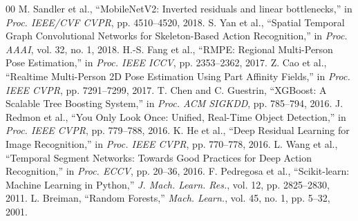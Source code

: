 \documentclass{ieeeaccess}
\begin{document}
\begin{thebibliography}{00}
 M. Sandler et al., ``MobileNetV2: Inverted residuals and linear bottlenecks,'' in \textit{Proc. IEEE/CVF CVPR}, pp. 4510--4520, 2018.
 S. Yan et al., ``Spatial Temporal Graph Convolutional Networks for Skeleton-Based Action Recognition,'' in \textit{Proc. AAAI}, vol. 32, no. 1, 2018.
 H.-S. Fang et al., ``RMPE: Regional Multi-Person Pose Estimation,'' in \textit{Proc. IEEE ICCV}, pp. 2353--2362, 2017.
 Z. Cao et al., ``Realtime Multi-Person 2D Pose Estimation Using Part Affinity Fields,'' in \textit{Proc. IEEE CVPR}, pp. 7291--7299, 2017.
 T. Chen and C. Guestrin, ``XGBoost: A Scalable Tree Boosting System,'' in \textit{Proc. ACM SIGKDD}, pp. 785--794, 2016.
 J. Redmon et al., ``You Only Look Once: Unified, Real-Time Object Detection,'' in \textit{Proc. IEEE CVPR}, pp. 779--788, 2016.
 K. He et al., ``Deep Residual Learning for Image Recognition,'' in \textit{Proc. IEEE CVPR}, pp. 770--778, 2016.
 L. Wang et al., ``Temporal Segment Networks: Towards Good Practices for Deep Action Recognition,'' in \textit{Proc. ECCV}, pp. 20--36, 2016.
 F. Pedregosa et al., ``Scikit-learn: Machine Learning in Python,'' \textit{J. Mach. Learn. Res.}, vol. 12, pp. 2825--2830, 2011.
 L. Breiman, ``Random Forests,'' \textit{Mach. Learn.}, vol. 45, no. 1, pp. 5--32, 2001.
\end{thebibliography}

\EOD
\end{document}
